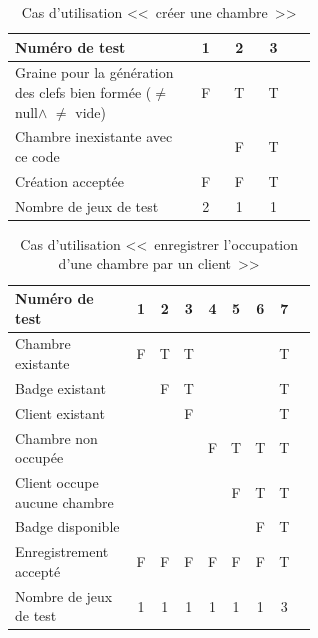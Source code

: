 \documentclass[11pt,article]{article}
\newcommand{\nullvalue}{\textsf{null}\xspace}
\begin{document}
\begin{table}[htbp!]
\begin{tabular}{|p{0.6\linewidth}|c|c|c|c|}
\hline
Numéro de test
&1&2&3\\
\hline

\hline
Graine pour la génération des clefs bien formée ($\neq$ \nullvalue $\land$ $\neq$ vide)
&F&T&T\\
\hline
Chambre inexistante avec ce code
& &F&T\\
\hline
\hline
Création acceptée
&F&F&T\\
\hline
\hline
Nombre de jeux de test
&2&1&1\\
\hline
\end{tabular}
\caption{Cas d'utilisation <<~créer une chambre~>>}
\end{table}
        \begin{table}[htbp!]
            \begin{tabular}{|p{0.6\linewidth}|c|c|c|c|c|c|c|c|}
                \hline
                Numéro de test
                    &1&2&3&4&5&6&7\\

                \hline
                Chambre existante
                    &F&T&T& & & &T\\
                \hline
                Badge existant
                    & &F&T& & & &T\\
				\hline
                Client existant
                    & & &F& & & &T\\
                \hline
                \hline
                Chambre non occupée
                    & & & &F&T&T&T\\
                \hline
				\hline
				Client occupe aucune chambre
					& & & & &F&T&T\\
				\hline
				\hline
				Badge disponible
					& & & & & &F&T\\
                \hline
                \hline
                Enregistrement accepté
                    &F&F&F&F&F&F&T\\
                \hline
                \hline
                Nombre de jeux de test
                                    &1&1&1&1&1&1&3\\
                \hline
            \end{tabular}
            \caption{Cas d'utilisation <<~enregistrer l'occupation d'une chambre par un client~>>}
        \end{table}
\end{document}
